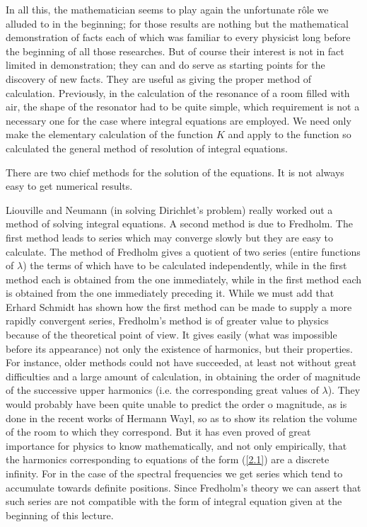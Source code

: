 \documentclass[12pt,oneside]{book}
\begin{document}
In all this, the mathematician seems to play again the unfortunate r\^ole we
alluded to in the beginning; for those results are nothing but the mathematical
demonstration of facts each of which was familiar to every physicist long
before the beginning of all those researches. But of course their interest is
not in fact limited in demonstration; they can and do serve as starting points
for the discovery of new facts. They are useful as giving the proper method of
calculation. Previously, in the calculation of the resonance of a room filled
with air, the shape of the resonator had to be quite simple, which requirement
is not a necessary one for the case where integral equations are employed. We
need only make the elementary calculation of the function $K$ and apply to the
function so calculated the general method of resolution of integral equations.
\par

There are two chief methods for the solution of the equations. It is not always
easy to get numerical results. \par

Liouville and Neumann (in solving Dirichlet's problem) really worked out a
method of solving integral equations. A second method is due to Fredholm. The
first method leads to series which may converge slowly but they are easy to
calculate. The method of Fredholm gives a quotient of two series (entire
functions of $\lambda$) the terms of which have to be calculated independently,
while in the first method each is obtained from the one immediately, while in
the first method each is obtained from the one immediately preceding it. While
we must add that Erhard Schmidt has shown how the first method can be made to
supply a more rapidly convergent series, Fredholm's method is of greater value
to physics because of the theoretical point of view. It gives easily (what was
impossible before its appearance) not only the existence of harmonics, but their
properties. For instance, older methods could not have succeeded, at least not
without great difficulties and a large amount of calculation, in obtaining the
order of magnitude of the successive upper harmonics (i.e. the corresponding
great values of $\lambda$). They would probably have been quite unable to
predict the order o magnitude, as is done in the recent works of Hermann Wayl,
so as to show its relation the volume of the room to which they correspond. But
it has even proved of great importance for physics to know mathematically, and
not only empirically, that the harmonics corresponding to equations of the form
(\ref{2.1}) are a discrete infinity. For in the case of the spectral frequencies
we get series which tend to accumulate towards definite positions. Since
Fredholm's theory we can assert that such series are not compatible with the
form of integral equation given at the beginning of this lecture. \par
\end{document}
